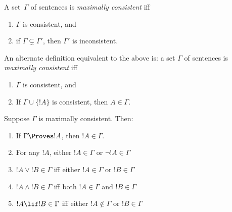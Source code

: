 \documentclass[../../include/open-logic-section]{subfiles}
\begin{document}

\begin{defn}
A set~$\Gamma$ of sentences is \emph{maximally consistent} iff
\begin{enumerate}
\item $\Gamma$ is consistent, and
\item if $\Gamma \subsetneq \Gamma'$, then $\Gamma'$ is inconsistent.
\end{enumerate}
\end{defn}

\begin{explain} %
An alternate definition equivalent to the above is: a set $\Gamma$ of sentences is 
\emph{maximally consistent} iff
\begin{enumerate}
\item $\Gamma$ is consistent, and
\item If $\Gamma \cup \{ !A \}$ is consistent, then $A \in \Gamma$.
\end{enumerate}
\end{explain}

\begin{prop}
Suppose $\Gamma$ is maximally consistent. Then:
\begin{enumerate}
\item If $\Gamma \Proves !A$, then $!A \in \Gamma$.
\item For any $!A$, either $!A \in \Gamma$ or $\lnot !A \in \Gamma$
\item $!A \lor !B \in \Gamma$ iff either $!A \in \Gamma$ or $!B \in \Gamma$
\item $!A \land !B \in \Gamma$ iff both $!A \in \Gamma$ and $!B \in \Gamma$
\item $!A \lif !B \in \Gamma$ iff either $!A \notin \Gamma$ or $!B \in \Gamma$
\end{enumerate}
\end{prop}
\end{document}
